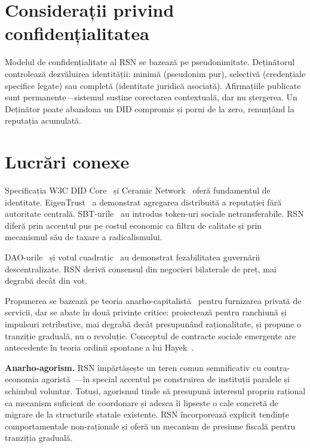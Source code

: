\documentclass[11pt,a4paper,twocolumn]{article}
\begin{document}
\section{Considerații privind confidențialitatea}

Modelul de confidențialitate al RSN se bazează pe pseudonimitate. Deținătorul controlează dezvăluirea identității: minimă (pseudonim pur), selectivă (credențiale specifice legate) sau completă (identitate juridică asociată). Afirmațiile publicate sunt permanente---sistemul susține corectarea contextuală, dar nu ștergerea. Un Deținător poate abandona un DID compromis și porni de la zero, renunțând la reputația acumulată.

\section{Lucrări conexe}

Specificația W3C DID Core~\cite{did2022} și Ceramic Network~\cite{ceramic2023} oferă fundamentul de identitate. EigenTrust~\cite{kamvar2003} a demonstrat agregarea distribuită a reputației fără autoritate centrală. SBT-urile~\cite{weyl2022} au introdus token-uri sociale netransferabile. RSN diferă prin accentul pus pe costul economic ca filtru de calitate și prin mecanismul său de taxare a radicalismului.

DAO-urile~\cite{buterin2014} și votul cuadratic~\cite{buterin2019} au demonstrat fezabilitatea guvernării descentralizate. RSN derivă consensul din negocieri bilaterale de preț, mai degrabă decât din vot.

Propunerea se bazează pe teoria anarho-capitalistă~\cite{rothbard1973,hoppe2001} pentru furnizarea privată de servicii, dar se abate în două privințe critice: proiectează pentru ranchiună și impulsuri retributive, mai degrabă decât presupunând raționalitate, și propune o tranziție graduală, nu o revoluție. Conceptul de contracte sociale emergente are antecedente în teoria ordinii spontane a lui Hayek~\cite{hayek1973}.

\textbf{Anarho-agorism.} RSN împărtășește un teren comun semnificativ cu contra-economia agoristă~\cite{konkin2006}---în special accentul pe construirea de instituții paralele și schimbul voluntar. Totuși, agorismul tinde să presupună interesul propriu rațional ca mecanism suficient de coordonare și adesea îi lipsește o cale concretă de migrare de la structurile statale existente. RSN încorporează explicit tendințe comportamentale non-raționale și oferă un mecanism de presiune fiscală pentru tranziția graduală.
\end{document}
